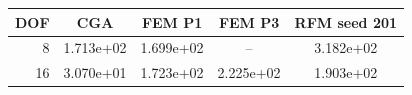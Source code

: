 \begin{tabular}{rcccc}
\toprule
DOF & CGA & FEM P1 & FEM P3 & RFM seed 201 \\
\midrule
8 & 1.713e+02 & 1.699e+02 & -- & 3.182e+02 \\
16 & 3.070e+01 & 1.723e+02 & 2.225e+02 & 1.903e+02 \\
\bottomrule
\end{tabular}
